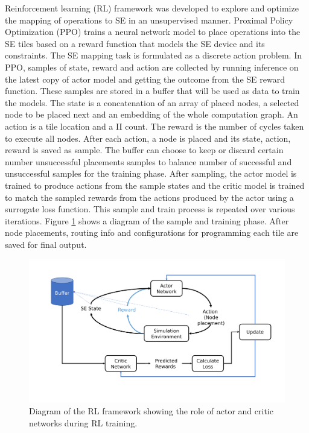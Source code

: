 Reinforcement learning (RL) framework was developed to explore and optimize the mapping of operations to SE in an unsupervised 
manner. Proximal Policy Optimization (PPO) trains a neural network model to place operations into the SE tiles based on a reward 
function that models the SE device and its constraints. The SE mapping task is formulated as a discrete action problem. In PPO, 
samples of state, reward and action are collected by running inference on the latest copy of actor model and getting the outcome 
from the SE reward function. These samples are stored in a buffer that will be used as data to train the models. The state is a 
concatenation of an array of placed nodes, a selected node to be placed next and an embedding of the whole computation graph. An 
action is a tile location and a II count. The reward is the number of cycles taken to execute all nodes. After each action, a node 
is placed and its state, action, reward is saved as sample. The buffer can choose to keep or discard certain number unsuccessful 
placements samples to balance number of successful and unsuccessful samples for the training phase. After sampling, the actor 
model is trained to produce actions from the sample states and the critic model is trained to match the sampled rewards from the 
actions produced by the actor using a surrogate loss function. This sample and train process is repeated over various iterations. 
Figure \ref{fig:ppo} shows a diagram of the sample and training phase. After node placements, routing info and configurations for programming each tile are saved for final output.

\begin{figure}[h]
  \centering
  \includegraphics[width=\linewidth]{fig/ppo.pdf}
  \caption{Diagram of the RL framework showing the role of actor and critic networks during RL training. }
  \label{fig:ppo}
\end{figure}


